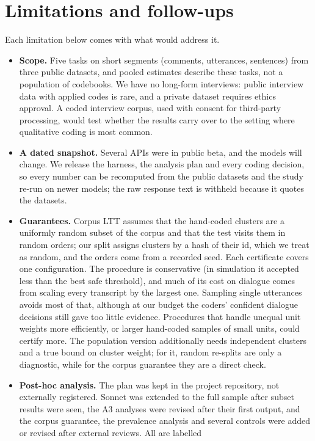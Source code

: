 \section{Limitations and follow-ups}
\label{sec:limitations}
Each limitation below comes with what would address it.
\begin{itemize}
  \item \textbf{Scope.} Five tasks on short segments (comments, utterances, sentences) from three public datasets, and pooled
  estimates describe these tasks, not a population of codebooks. We have no long-form interviews: public interview data with
  applied codes is rare, and a private dataset requires ethics approval. A coded interview corpus, used with consent for
  third-party processing, would test whether the results carry over to the setting where qualitative coding is most common.
  \item \textbf{A dated snapshot.} Several APIs were in public beta, and the models will change. We release the harness, the
  analysis plan and every coding decision, so every number can be recomputed from the public datasets and the study re-run
  on newer models; the raw response text is withheld because it quotes the datasets.
  \item \textbf{Guarantees.} Corpus LTT assumes that the hand-coded clusters are a uniformly random subset of the corpus and
  that the test visits them in random orders; our split assigns clusters by a hash of their id, which we treat as random, and
  the orders come from a recorded seed. Each certificate covers one configuration. The procedure is conservative (in
  simulation it accepted less than the best safe threshold), and much of its cost on dialogue comes from scaling every
  transcript by the largest one. Sampling single utterances avoids most of that, although at our budget the coders' confident
  dialogue decisions still gave too little evidence. Procedures that handle unequal unit weights more efficiently, or larger
  hand-coded samples of small units, could certify more. The population version additionally needs independent clusters and
  a true bound on cluster weight; for it, random re-splits are only a diagnostic, while for the corpus guarantee they are a
  direct check.
  \item \textbf{Post-hoc analysis.} The plan was kept in the project repository, not externally registered. Sonnet was extended
  to the full sample after subset results were seen, the A3 analyses were revised after their first output, and the corpus
  guarantee, the prevalence analysis and several controls were added or revised after external reviews. All are labelled

\end{itemize}
